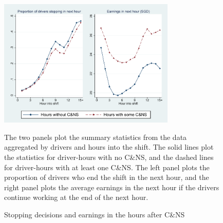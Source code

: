 \documentclass[reviewmode,AEJ]{AEA}
\begin{document}
\begin{figure}[htb]
	{\centering
		\caption{Stopping decisions and earnings in the hours after C\&NS} %
		\includegraphics[width=0.75\textwidth]{./fg/modelfreecumhours.pdf}
		\label{fg:quitbyhour}
	}
	\begin{figurenotes}
	\small The two panels plot the summary statistics from the data aggregated by drivers and hours into the shift. The solid lines plot the statistics for driver-hours with no C\&NS, and the dashed lines for driver-hours with at least one C\&NS. The left panel plots the proportion of drivers who end the shift in the next hour, and the right panel plots the average earnings in the next hour if the drivers continue working at the end of the next hour.
	\end{figurenotes}


\hfill


\end{figure}
\end{document}

